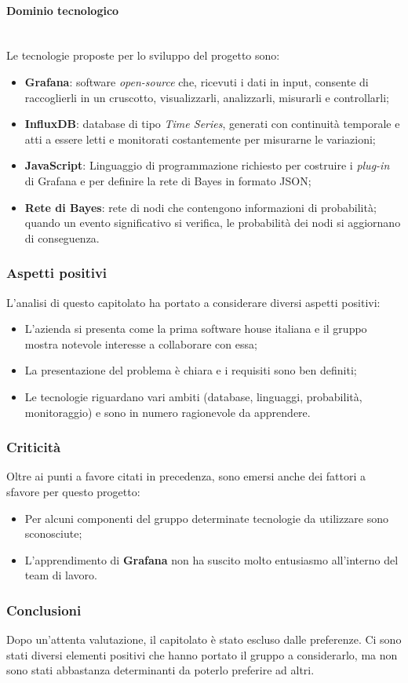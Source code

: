 \paragraph {Dominio tecnologico} \mbox{} \\
Le tecnologie proposte per lo sviluppo del progetto sono:
\begin{itemize}
	\item \textbf{Grafana}: software \textit{open-source} che, ricevuti i dati in 
input,
	 consente di raccoglierli in un cruscotto, visualizzarli, analizzarli, 
	 misurarli e controllarli;
	\item \textbf{InfluxDB}: database di tipo \textit{Time Series}, generati con 
continuità
	 temporale e atti a essere letti e monitorati costantemente per misurarne 
	 le variazioni;
	\item \textbf{JavaScript}: Linguaggio di programmazione richiesto per costruire 
i 
	\textit{plug-in} di Grafana e per definire la rete di Bayes in formato JSON;
	\item \textbf{Rete di Bayes}: rete di nodi che contengono informazioni di 
probabilità; quando un evento significativo si verifica, le probabilità dei nodi si 
aggiornano di conseguenza.
\end{itemize}
\subsubsection{Aspetti positivi}
L'analisi di questo capitolato ha portato a considerare diversi aspetti 
positivi:
\begin{itemize}
	\item L'azienda si presenta come la prima software house italiana e il gruppo 
mostra 
	notevole interesse a collaborare con essa;
	\item La presentazione del problema è chiara e i requisiti sono ben definiti;
	\item Le tecnologie riguardano vari ambiti (database, linguaggi, probabilità, 
	monitoraggio) e sono in numero ragionevole da apprendere.
\end{itemize}
\subsubsection{Criticità}
Oltre ai punti a favore citati in precedenza, sono emersi anche dei fattori a 
sfavore per
questo progetto:
\begin{itemize}
	\item Per alcuni componenti del gruppo determinate tecnologie da  utilizzare 
	sono sconosciute;
	\item L'apprendimento di \textbf{Grafana} non ha suscito molto 
	entusiasmo all'interno del team di lavoro.
\end{itemize}
\subsubsection{Conclusioni}
Dopo un'attenta valutazione, il capitolato è stato escluso dalle preferenze. Ci 
sono stati diversi elementi positivi che hanno portato il gruppo a considerarlo,
ma non sono stati abbastanza determinanti da poterlo preferire ad altri.

